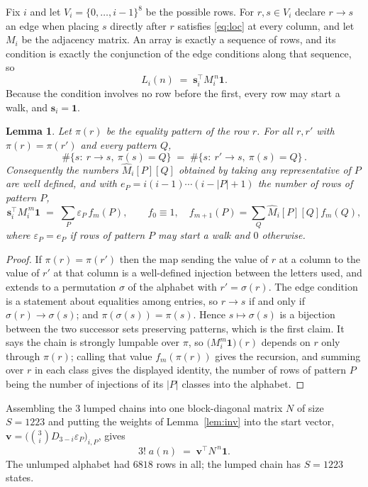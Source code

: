 \documentclass[11pt,a4paper]{article}
\theoremstyle{plain}
\newtheorem{lemma}[theorem]{Lemma}
\theoremstyle{definition}
\begin{document}
Fix $i$ and let $V_i=\{0,\dots,i-1\}^{8}$ be the possible rows. For $r,s\in V_i$
declare $r\to s$ an edge when placing $s$ directly after $r$ satisfies \eqref{eq:loc} at
every column, and let $M_i$ be the adjacency matrix. An array is exactly a sequence of
rows, and its condition is exactly the conjunction of the edge conditions along that
sequence, so
\[
L_i(n)\;=\;\mathbf{s}_i^{\!\top}M_i^{\,n}\mathbf{1} .
\]
Because the condition involves no row before the first, every
row may start a walk, and $\mathbf{s}_i=\mathbf{1}$.

\begin{lemma}\label{lem:lump}
Let $\pi(r)$ be the equality pattern of the row $r$. For all $r,r'$ with
$\pi(r)=\pi(r')$ and every pattern $Q$,
\[
\#\{s:\ r\to s,\ \pi(s)=Q\}\;=\;\#\{s:\ r'\to s,\ \pi(s)=Q\}\, .
\]
Consequently the numbers $\widehat M_i[P][Q]$ obtained by taking any representative of $P$
are well defined, and with $e_P=i(i-1)\cdots(i-|P|+1)$ the number of rows of pattern $P$,
\[
\mathbf{s}_i^{\!\top}M_i^{\,m}\mathbf{1}\;=\;\sum_P \varepsilon_P\,f_m(P),
\qquad f_0\equiv1,\quad f_{m+1}(P)=\sum_Q\widehat M_i[P][Q]f_m(Q),
\]
where $\varepsilon_P=e_P$ if rows of pattern $P$ may start a walk and $0$ otherwise.
\end{lemma}

\begin{proof}
If $\pi(r)=\pi(r')$ then the map sending the value of $r$ at a column to the value of $r'$
at that column is a well-defined injection between the letters used, and extends to a
permutation $\sigma$ of the alphabet with $r'=\sigma(r)$. The edge condition is a statement
about equalities among entries, so $r\to s$ if and only if $\sigma(r)\to\sigma(s)$; and
$\pi(\sigma(s))=\pi(s)$. Hence $s\mapsto\sigma(s)$ is a bijection between the two successor
sets preserving patterns, which is the first claim. It says the chain is strongly lumpable
over $\pi$, so $\bigl(M_i^{m}\mathbf{1}\bigr)(r)$ depends on $r$ only through $\pi(r)$;
calling that value $f_m(\pi(r))$ gives the recursion, and summing over $r$ in each class
gives the displayed identity, the number of rows of pattern $P$ being the number of
injections of its $|P|$ classes into the alphabet.
\end{proof}

Assembling the $3$ lumped chains into one block-diagonal matrix $N$ of size $S=1223$ and
putting the weights of Lemma~\ref{lem:inv} into the start vector,
$\mathbf{v}=\bigl(\binom{3}{i}D_{3-i}\varepsilon_P\bigr)_{i,P}$, gives
\begin{equation}\label{eq:walk}
3!\;a(n)\;=\;\mathbf{v}^{\!\top}N^{\,n}\mathbf{1} .
\end{equation}
The unlumped alphabet had $6818$ rows in all; the lumped chain has $S=1223$ states.
\end{document}
